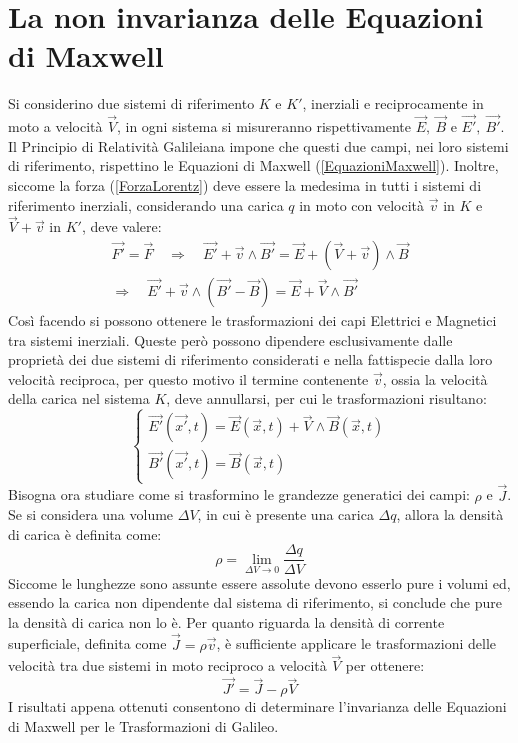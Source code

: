 \section{La non invarianza delle Equazioni di Maxwell}

 Si considerino due sistemi di riferimento $K$ e $K'$, inerziali e reciprocamente in moto a velocità $\vec{V}$, in ogni sistema 
 si misureranno rispettivamente $\vec{E},\ \vec{B}$ e $\vec{E'},\ \vec{B'}$.\\ Il Principio di Relatività Galileiana impone che 
 questi due campi, nei loro sistemi di riferimento, rispettino le Equazioni di Maxwell (\ref{EquazioniMaxwell}). Inoltre, siccome la forza (\ref{ForzaLorentz})
 deve essere la medesima in tutti i sistemi di riferimento inerziali, considerando una carica $q$ in moto con velocità $\vec{v}$ 
 in $K$ e $\vec{V}+\vec{v}$ in $K'$, deve valere:
 \begin{equation*}
	\begin{gathered}
		\vec{F'}=\vec{F}\quad\Rightarrow\quad \vec{E'}+\vec{v}\wedge\vec{B'}=\vec{E}+(\vec{V}+\vec{v})\wedge\vec{B}\\
         \Rightarrow\quad \vec{E'}+\vec{v}\wedge(\vec{B'}-\vec{B})=\vec{E}+\vec{V}\wedge\vec{B'}
	\end{gathered}
 \end{equation*}
Così facendo si possono ottenere le trasformazioni dei capi Elettrici e Magnetici tra sistemi inerziali. Queste però possono dipendere 
esclusivamente dalle proprietà dei due sistemi di riferimento 
considerati e nella fattispecie dalla loro velocità reciproca, per questo motivo il termine contenente $\vec{v}$, 
ossia la velocità della carica nel sistema $K$, deve annullarsi, per cui le trasformazioni risultano:
\begin{equation}
	\begin{cases}
		\vec{E'}(\vec{x'},t)=\vec{E}(\vec{x},t)+\vec{V}\wedge\vec{B}(\vec{x},t)\\
		\vec{B'}(\vec{x'},t)=\vec{B}(\vec{x},t)
	\end{cases}
	\label{TrasfGalileoEB}
\end{equation}
Bisogna ora studiare come si trasformino le grandezze generatici dei campi:
$\rho$ e $\vec{J}$. Se si considera una volume $\Delta V$, in cui è presente una carica 
$\Delta q$, allora la densità di carica è definita come:
\begin{equation*}
	\rho=\lim_{\Delta V\rightarrow 0}\frac{\Delta q}{\Delta V}
\end{equation*}
Siccome le lunghezze sono assunte essere assolute devono esserlo pure i volumi ed, 
essendo la carica non dipendente dal sistema di riferimento, si conclude che pure la 
densità di carica non lo è. Per quanto riguarda la densità di corrente superficiale, 
definita come $\vec{J}=\rho\vec{v}$,  
è sufficiente applicare le trasformazioni delle velocità tra due sistemi in moto reciproco 
a velocità $\vec{V}$ per ottenere:
\begin{equation}
	\vec{J'}=\vec{J}-\rho\vec{V}
\end{equation}
I risultati appena ottenuti consentono di determinare l'invarianza delle Equazioni di 
Maxwell per le Trasformazioni di Galileo.\\

